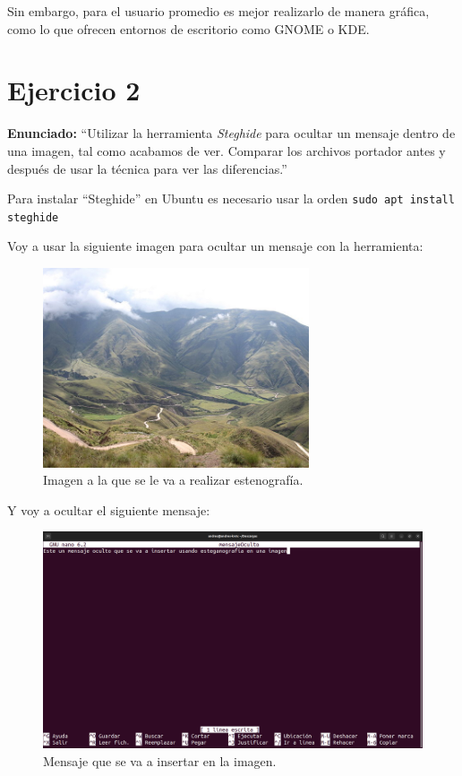 \documentclass{article}
\begin{document}
Sin embargo, para el usuario promedio es mejor realizarlo de manera gráfica, como lo que ofrecen entornos de escritorio como GNOME o KDE.

\newpage

\section{Ejercicio 2}

\textbf{Enunciado: }``Utilizar la herramienta \textit{Steghide} para ocultar un mensaje dentro de una imagen, tal como acabamos de ver. Comparar los archivos portador antes y después de usar la técnica para ver las diferencias.''

\bigskip

Para instalar ``Steghide'' en Ubuntu es necesario usar la orden \verb|sudo apt install steghide|

\bigskip

Voy a usar la siguiente imagen para ocultar un mensaje con la herramienta:

\begin{figure}[H]
    \centering
    \includegraphics[width=0.7\textwidth]{imagenes/imagen.jpg}
    \caption{Imagen a la que se le va a realizar estenografía.}
\end{figure}

Y voy a ocultar el siguiente mensaje:

\begin{figure}[H]
    \includegraphics[width=\textwidth]{imagenes/Captura desde 2022-10-30 11-27-46.png}
    \caption{Mensaje que se va a insertar en la imagen.}
\end{figure}
\end{document}
